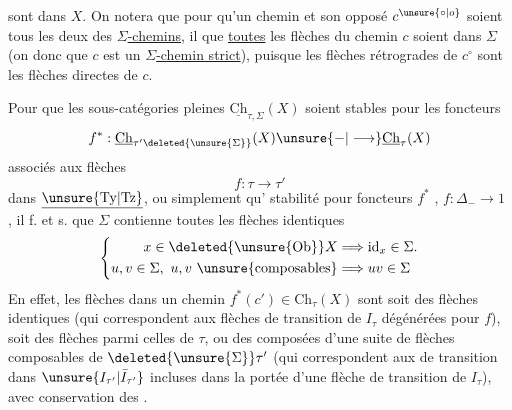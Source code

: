 sont dans $X$. On notera que pour qu'un chemin  et son opposé $c^{\unsure{\circ|o}}$ soient tous les deux des \uline{$\Sigma$-chemins}, il  que \uline{toutes} les flèches du chemin $c$ soient dans $\Sigma$ (on  donc que $c$ est un \uline{$\Sigma$-chemin strict}), puisque les flèches rétrogrades de $c^\circ$ sont les flèches  directes de $c$.

Pour que les sous-catégories pleines $\underline{\mathrm{Ch}}_{\tau,\Sigma}(X)$ soient stables pour les foncteurs 
\[f^*:\underline{\mathrm{Ch}}_{\tau'\deleted{\unsure{\Sigma}}}(X)\unsure{\mathord{-}|\longrightarrow}\underline{\mathrm{Ch}}_\tau(X)\]
associés aux flèches
\[f:\tau\longrightarrow\tau'\]
dans $\underline{\unsure{\mathrm{Ty}|\mathrm{Tz}}}$, ou simplement  qu'  stabilité pour  foncteurs $f^*$  ,  $f:\Delta_-\longrightarrow1$ , il f. et s. que $\Sigma$  contienne toutes les flèches identiques \unsure{:|;}
\[\left\{\begin{aligned}x\in\deleted{\unsure{\mathrm{Ob}}}X&\Longrightarrow\mathrm{id}_x\in\Sigma.\\
u,v\in\Sigma,\ u,v\ \text{\unsure{composables}}&\Longrightarrow uv\in\Sigma\end{aligned}\right.\]
En effet, les flèches dans un chemin $f^*(c')\in\mathrm{Ch}_\tau(X)$ sont soit  des flèches identiques (qui correspondent aux  flèches de transition de $I_\tau$ dégénérées pour $f$), soit des flèches parmi celles de $\tau$, ou des composées d'une suite de flèches  composables de $\deleted{\unsure{\Sigma}}\tau'$ (qui correspondent aux  de transition dans $\unsure{I_{\tau'}|\bar I_{\tau'}}$ incluses dans la portée d'une flèche de transition de $I_\tau$), avec conservation des .
